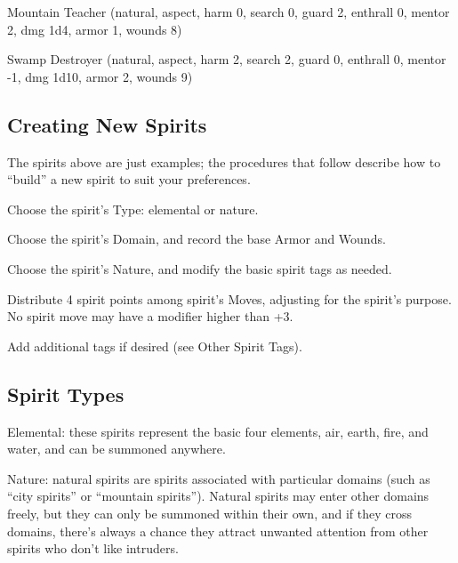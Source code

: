 Mountain Teacher (natural, aspect, harm 0, search 0, guard 2, enthrall 0, mentor 2, dmg 1d4, armor 1, wounds 8)

Swamp Destroyer (natural, aspect, harm 2, search 2, guard 0, enthrall 0, mentor -1, dmg 1d10, armor 2, wounds 9)

\subsection{Creating New Spirits}
The spirits above are just examples; the procedures that follow describe how to “build” a new spirit to suit your preferences.

Choose the spirit’s Type: elemental or nature.

Choose the spirit’s Domain, and record the base Armor and Wounds.

Choose the spirit’s Nature, and modify the basic spirit tags as needed.

Distribute 4 spirit points among spirit’s Moves, adjusting for the spirit’s purpose. No spirit move may have a modifier higher than +3.

Add additional tags if desired (see Other Spirit Tags).



\subsection{Spirit Types}
Elemental: these spirits represent the basic four elements, air, earth, fire, and water, and can be summoned anywhere.

Nature: natural spirits are spirits associated with particular domains (such as “city spirits” or “mountain spirits”). Natural spirits may enter other domains freely, but they can only be summoned within their own, and if they cross domains, there’s always a chance they attract unwanted attention from other spirits who don’t like intruders.

